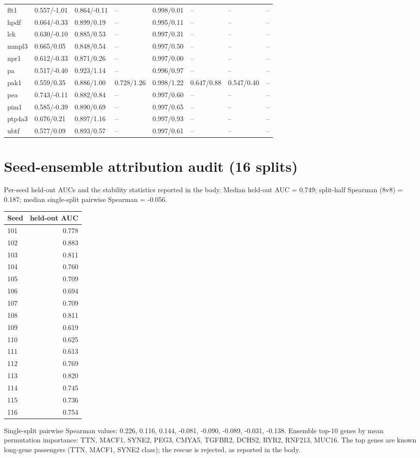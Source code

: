 \begin{footnotesize}
\begin{longtable}{llllllll}
flt1 & 0.557/-1.01 & 0.864/-0.11 & -- & 0.998/0.01 & -- & -- & -- \\
hpdf & 0.664/-0.33 & 0.899/0.19 & -- & 0.995/0.11 & -- & -- & -- \\
lck & 0.630/-0.10 & 0.885/0.53 & -- & 0.997/0.31 & -- & -- & -- \\
mmpl3 & 0.665/0.05 & 0.848/0.54 & -- & 0.997/0.50 & -- & -- & -- \\
npr1 & 0.612/-0.33 & 0.871/0.26 & -- & 0.997/0.00 & -- & -- & -- \\
pa & 0.517/-0.40 & 0.923/1.14 & -- & 0.996/0.97 & -- & -- & -- \\
pak1 & 0.559/0.35 & 0.886/1.00 & 0.728/1.26 & 0.998/1.22 & 0.647/0.88 & 0.547/0.40 & -- \\
pea & 0.743/-0.11 & 0.882/0.84 & -- & 0.997/0.60 & -- & -- & -- \\
pim1 & 0.585/-0.39 & 0.890/0.69 & -- & 0.997/0.65 & -- & -- & -- \\
ptp4a3 & 0.676/0.21 & 0.897/1.16 & -- & 0.997/0.93 & -- & -- & -- \\
ubtf & 0.577/0.09 & 0.893/0.57 & -- & 0.997/0.61 & -- & -- & -- \\
\end{longtable}
\end{footnotesize}
\section{Seed-ensemble attribution audit (16 splits)}
Per-seed held-out AUCs and the stability statistics reported in the body. Median held-out AUC = 0.749; split-half Spearman (8v8) = 0.187; median single-split pairwise Spearman = -0.056.
\begin{center}\begin{tabular}{lr}
\hline\hline Seed & held-out AUC \\ \hline
101 & 0.778 \\
102 & 0.883 \\
103 & 0.811 \\
104 & 0.760 \\
105 & 0.709 \\
106 & 0.694 \\
107 & 0.709 \\
108 & 0.811 \\
109 & 0.619 \\
110 & 0.625 \\
111 & 0.613 \\
112 & 0.769 \\
113 & 0.820 \\
114 & 0.745 \\
115 & 0.736 \\
116 & 0.754 \\
\hline\hline\end{tabular}\end{center}
Single-split pairwise Spearman values: 0.226, 0.116, 0.144, -0.081, -0.090, -0.089, -0.031, -0.138.
Ensemble top-10 genes by mean permutation importance: TTN, MACF1, SYNE2, PEG3, CMYA5, TGFBR2, DCHS2, RYR2, RNF213, MUC16. The top genes are known long-gene passengers (TTN, MACF1, SYNE2 class); the rescue is rejected, as reported in the body.

